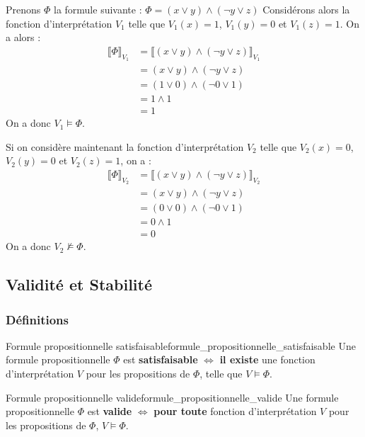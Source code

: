\begin{example}\leavevmode
  Prenons $\Phi$ la formule suivante : $\Phi = (x\vee y) \wedge (\neg y \vee z)$
  Considérons alors la fonction d'interprétation $V_1$ telle que $V_1(x)=1$, $V_1(y)=0$ et $V_1(z)=1$.
  On a alors : 
  \begin{align*}
    \llbracket\Phi\rrbracket_{V_1} &= \llbracket(x\vee y)\wedge(\neg y\vee z)\rrbracket_{V_1} \\
                                   &= (x\vee y) \wedge (\neg y \vee z) \\ 
                                   &= (1\vee 0) \wedge (\neg 0 \vee 1) \\ 
                                   &= 1 \wedge 1 \\ 
                                   &= 1
  \end{align*}
  On a donc $V_1\vDash\Phi$. 

  Si on considère maintenant la fonction d'interprétation $V_2$ telle que $V_2(x)=0$, $V_2(y)=0$ et $V_2(z)=1$, on a :
  \begin{align*}
    \llbracket\Phi\rrbracket_{V_2} &= \llbracket(x\vee y)\wedge(\neg y\vee z)\rrbracket_{V_2} \\
                                   &= (x\vee y) \wedge (\neg y \vee z) \\ 
                                   &= (0\vee 0) \wedge (\neg 0 \vee 1) \\ 
                                   &= 0 \wedge 1 \\ 
                                   &= 0 
  \end{align*} 
  On a donc $V_2\nvDash\Phi$.
\end{example}

\subsection{Validité et Stabilité}
\subsubsection{Définitions}
\begin{definition}{Formule propositionnelle satisfaisable}{formule_propositionnelle_satisfaisable}
Une formule propositionnelle $\Phi$ est \textbf{satisfaisable} $\Leftrightarrow$ \textbf{il existe} une fonction d'interprétation $V$ pour les propositions de $\Phi$, telle que 
$V\vDash\Phi$.
\end{definition}
\begin{definition}{Formule propositionnelle valide}{formule_propositionnelle_valide}
Une formule propositionnelle $\Phi$ est \textbf{valide} $\Leftrightarrow$ \textbf{pour toute} fonction d'interprétation $V$ pour les propositions de $\Phi$, $V\vDash\Phi$.
\end{definition}

